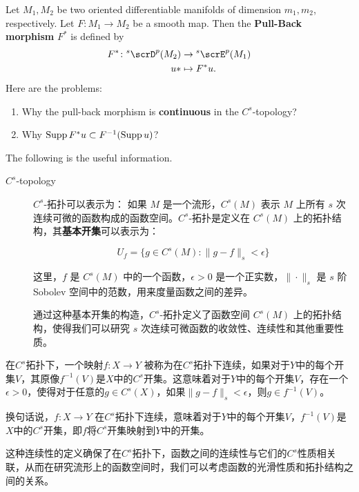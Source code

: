 \documentclass[lang=cn,zihao=-4,a4paper,fontset=none]{beautybook}
\begin{document}
\begin{problem}
    Let $M_1,M_2$ be two oriented differentiable manifolds of dimension $m_1,m_2$, respectively. Let $F\colon M_1\to M_2$ be a smooth map. Then the \textbf{Pull-Back morphism} $F^*$ is defined by 
    \[
        \begin{aligned}
                    F^* \colon {}^s \scrD^p(M_2) &\to {}^s\scrE^p(M_1)\\ 
                    u* &\mapsto F^* u.
        \end{aligned}
    \]
    Here are the problems: 
    \begin{enumerate}
        \item     Why the pull-back morphism is \textbf{continuous} in the $C^s$-topology? 
        \item Why $\operatorname{Supp} F^* u\subset F^{-1}(\operatorname{Supp} u)$?
    \end{enumerate}
\tcblower
The following is the useful information. 
\begin{description}
    \item[$C^s$-topology] $C^s$-拓扑可以表示为：
    如果 $M$ 是一个流形，$C^s(M)$ 表示 $M$ 上所有 $s$ 次连续可微的函数构成的函数空间。$C^s$-拓扑是定义在 $C^s(M)$ 上的拓扑结构，其\textbf{基本开集}可以表示为：
    
    $$ U_f = \{ g \in C^s(M) : \| g - f \|_s < \epsilon \} $$
    
    这里，$f$ 是 $C^s(M)$ 中的一个函数，$\epsilon > 0$ 是一个正实数，$\| \cdot \|_s$ 是 $s$ 阶 Sobolev 空间中的范数，用来度量函数之间的差异。
    
    通过这种基本开集的构造，$C^s$-拓扑定义了函数空间 $C^s(M)$ 上的拓扑结构，使得我们可以研究 $s$ 次连续可微函数的收敛性、连续性和其他重要性质。
\end{description}
在$C^s$拓扑下，一个映射$f: X \to Y$ 被称为在$C^s$拓扑下连续，如果对于$Y$中的每个开集$V$，其原像$f^{-1}(V)$是$X$中的$C^s$开集。这意味着对于$Y$中的每个开集$V$，存在一个$\epsilon > 0$，使得对于任意的$g \in C^s(X)$，如果$\| g - f \|_s < \epsilon$，则$g \in f^{-1}(V)$。

换句话说，$f: X \to Y$ 在$C^s$拓扑下连续，意味着对于$Y$中的每个开集$V$，$f^{-1}(V)$是$X$中的$C^s$开集，即$f$将$C^s$开集映射到$Y$中的开集。

这种连续性的定义确保了在$C^s$拓扑下，函数之间的连续性与它们的$C^s$性质相关联，从而在研究流形上的函数空间时，我们可以考虑函数的光滑性质和拓扑结构之间的关系。
\end{problem}
    
\end{document}
